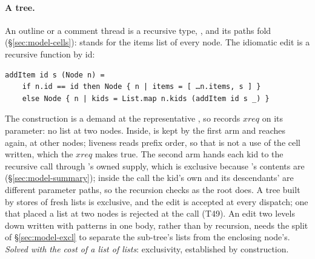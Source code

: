 \paragraph{A tree.} An outline or a comment thread is a recursive type,
, and its paths fold
(\S\ref{sec:model-cells}):  stands for the items list of every node. The idiomatic edit is a
recursive function by id:
\begin{Verbatim}
addItem id s (Node n) =
    if n.id == id then Node { n | items = [ …n.items, s ] }
    else Node { n | kids = List.map n.kids (addItem id s _) }
\end{Verbatim}
The construction is a demand at the representative , so  records
$\mathit{xreq}$ on its parameter: no list at two nodes. Inside,  is kept by the first arm and
reaches  again, at other nodes; liveness reads prefix order, so that is not a use of the
cell written, which the $\mathit{xreq}$ makes true. The second arm hands each kid to the recursive call
through 's owned supply, which is exclusive because 's contents are
(\S\ref{sec:model-summary}); inside the call the kid's own  and its descendants' are
different parameter paths, so the recursion checks as the root does. A tree built by stores of fresh
lists is exclusive, and the edit is accepted at every dispatch; one that placed a list at two nodes is
rejected at the call (T49). An edit two levels down written with patterns in one body, rather than by
recursion, needs the split of \S\ref{sec:model-excl} to separate the sub-tree's lists from the enclosing
node's. \emph{Solved with the cost of a list of lists}: exclusivity, established by construction.

